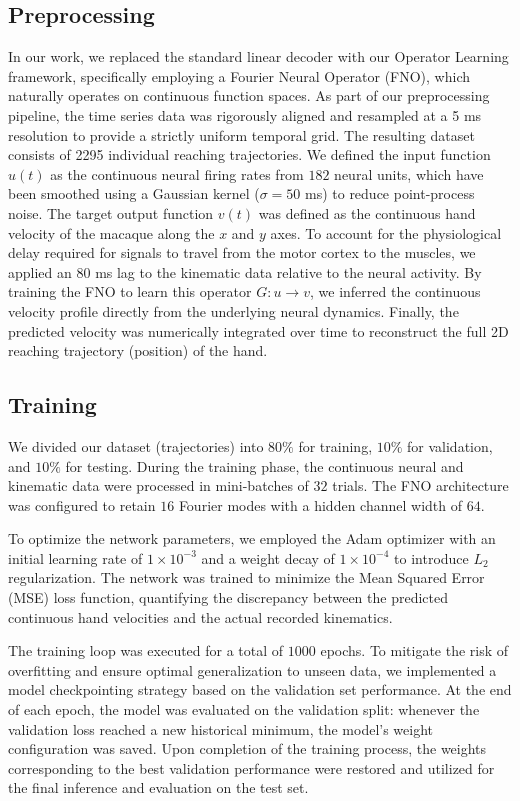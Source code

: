 \clearpage
\subsection{Preprocessing}
In our work, we replaced the standard linear decoder with our Operator Learning framework, specifically employing a Fourier Neural Operator (FNO), which naturally operates on continuous function spaces. As part of our preprocessing pipeline, the time series data was rigorously aligned and resampled at a 5 ms resolution to provide a strictly uniform temporal grid. The resulting dataset consists of 2295 individual reaching trajectories.
 We defined the input function $u(t)$ as the continuous neural firing rates from $182$ neural units, which have been smoothed using a Gaussian kernel ($\sigma = 50$ ms) to reduce point-process noise. The target output function $v(t)$ was defined as the continuous hand velocity of the macaque along the $x$ and $y$ axes. To account for the physiological delay required for signals to travel from the motor cortex to the muscles, we applied an $80$ ms lag to the kinematic data relative to the neural activity. By training the FNO to learn this operator $G: u \to v$, we inferred the continuous velocity profile directly from the underlying neural dynamics. Finally, the predicted velocity was numerically integrated over time to reconstruct the full 2D reaching trajectory (position) of the hand.

\subsection{Training}
We divided our dataset (trajectories) into $80\%$ for training, $10\%$ for validation, and $10\%$ for testing. During the training phase, the continuous neural and kinematic data were processed in mini-batches of $32$ trials. The FNO architecture was configured to retain $16$ Fourier modes with a hidden channel width of $64$. 

To optimize the network parameters, we employed the Adam optimizer with an initial learning rate of $1 \times 10^{-3}$ and a weight decay of $1 \times 10^{-4}$ to introduce $L_2$ regularization. The network was trained to minimize the Mean Squared Error (MSE) loss function, quantifying the discrepancy between the predicted continuous hand velocities and the actual recorded kinematics. 

The training loop was executed for a total of $1000$ epochs. To mitigate the risk of overfitting and ensure optimal generalization to unseen data, we implemented a model checkpointing strategy based on the validation set performance. At the end of each epoch, the model was evaluated on the validation split: whenever the validation loss reached a new historical minimum, the model's weight configuration was saved. Upon completion of the training process, the weights corresponding to the best validation performance were restored and utilized for the final inference and evaluation on the test set.


